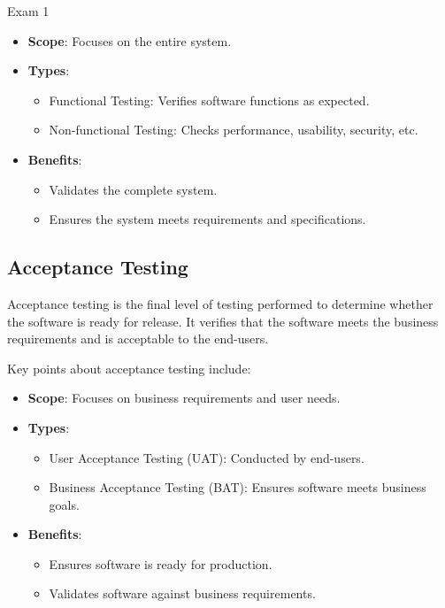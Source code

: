 \begin{examnotes}{Exam 1}
\begin{highlight}
        \begin{itemize}
            \item \textbf{Scope}: Focuses on the entire system.
            \item \textbf{Types}:
                \begin{itemize}
                    \item Functional Testing: Verifies software functions as expected.
                    \item Non-functional Testing: Checks performance, usability, security, etc.
                \end{itemize}
            \item \textbf{Benefits}:
                \begin{itemize}
                    \item Validates the complete system.
                    \item Ensures the system meets requirements and specifications.
                \end{itemize}
        \end{itemize}
    \end{highlight}
    
    \subsection*{Acceptance Testing}
    
    Acceptance testing is the final level of testing performed to determine whether the software is ready for release. It verifies that the software meets the business requirements and is acceptable to the end-users.
    
    \begin{highlight}
        Key points about acceptance testing include:
        
        \begin{itemize}
            \item \textbf{Scope}: Focuses on business requirements and user needs.
            \item \textbf{Types}:
                \begin{itemize}
                    \item User Acceptance Testing (UAT): Conducted by end-users.
                    \item Business Acceptance Testing (BAT): Ensures software meets business goals.
                \end{itemize}
            \item \textbf{Benefits}:
                \begin{itemize}
                    \item Ensures software is ready for production.
                    \item Validates software against business requirements.
                \end{itemize}
        \end{itemize}
    \end{highlight}
    

\end{examnotes}

